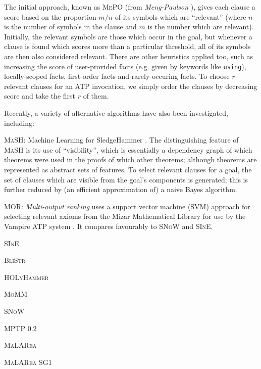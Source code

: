 The initial approach, known as \textsc{MePO} (from \emph{Meng-Paulson}
\cite{meng2009lightweight}), gives each clause a score based on the proportion
$m / n$ of its symbols which are ``relevant'' (where $n$ is the number of
symbols in the clause and $m$ is the number which are relevant). Initially, the
relevant symbols are those which occur in the goal, but whenever a clause is
found which scores more than a particular threshold, all of its symbols are then
also considered relevant. There are other heuristics applied too, such as
increasing the score of user-provided facts (e.g. given by keywords like
\texttt{using}), locally-scoped facts, first-order facts and rarely-occuring
facts. To choose $r$ relevant clauses for an ATP invocation, we simply order the
clauses by decreasing score and take the first $r$ of them.

Recently, a variety of alternative algorithms have also been investigated,
including:

\begin{description}
\item{\textsc{MaSH}}: Machine Learning for SledgeHammer
  \cite{kuhlwein2013mash}. The distinguishing feature of \textsc{MaSH} is its
  use of ``visibility'', which is essentially a dependency graph of which
  theorems were used in the proofs of which other theorems; although theorems
  are represented as abstract sets of features. To select relevant clauses for a
  goal, the set of clauses which are visible from the goal's components is
  generated; this is further reduced by (an efficient approximation of) a naive
  Bayes algorithm.

\item{\textsc{MOR}}: \emph{Multi-output ranking} uses a support vector machine
  (SVM) approach for selecting relevant axioms from the Mizar Mathematical
  Library for use by the Vampire ATP system \cite{alama2014premise}. \iffalse
  TODO: describe the kernel, as that's the interesting bit \fi It compares
  favourably to \textsc{SNoW} and \textsc{SInE}.

\item{\textsc{SInE}}
\item{\textsc{BliStr}}
\item{\textsc{HOLyHammer}}
\item{\textsc{MoMM}}
\item{\textsc{SNoW}}
\item{\textsc{MPTP 0.2}}
\item{\textsc{MaLARea}}
\item{\textsc{MaLARea SG1}}

\end{description}

